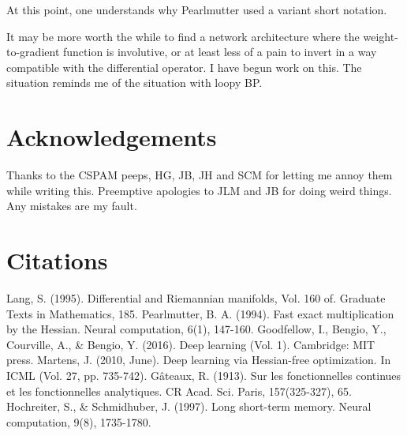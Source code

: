 \documentclass{article}
\begin{document}
At this point, one understands why Pearlmutter used a variant short notation.

It may be more worth the while to find a network architecture where the weight-to-gradient function is involutive, or at least less of a pain to invert in a way compatible with the differential operator. I have begun work on this. The situation reminds me of the situation with loopy BP.

\section{Acknowledgements}

Thanks to the CSPAM peeps, HG, JB, JH and SCM for letting me annoy them while writing this. Preemptive apologies to JLM and JB for doing weird things. Any mistakes are my fault.

\section{Citations}

\begin{thebibliography}{9}
Lang, S. (1995). Differential and Riemannian manifolds, Vol. 160 of. Graduate Texts in Mathematics, 185.
Pearlmutter, B. A. (1994). Fast exact multiplication by the Hessian. Neural computation, 6(1), 147-160.
Goodfellow, I., Bengio, Y., Courville, A., \& Bengio, Y. (2016). Deep learning (Vol. 1). Cambridge: MIT press.
Martens, J. (2010, June). Deep learning via Hessian-free optimization. In ICML (Vol. 27, pp. 735-742).
G\^{a}teaux, R. (1913). Sur les fonctionnelles continues et les fonctionnelles analytiques. CR Acad. Sci. Paris, 157(325-327), 65.
Hochreiter, S., \& Schmidhuber, J. (1997). Long short-term memory. Neural computation, 9(8), 1735-1780.
\end{thebibliography}
\end{document}
